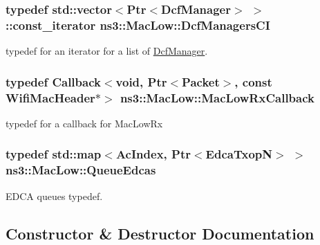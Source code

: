 \subsubsection[{\texorpdfstring{Dcf\+Managers\+CI}{DcfManagersCI}}]{\setlength{\rightskip}{0pt plus 5cm}typedef std\+::vector$<${\bf Ptr}$<${\bf Dcf\+Manager}$>$ $>$\+::const\+\_\+iterator {\bf ns3\+::\+Mac\+Low\+::\+Dcf\+Managers\+CI}\hspace{0.3cm}{\ttfamily [private]}}\hypertarget{classns3_1_1MacLow_abf949b68f435e702d6d30c9a1515b35d}{}\label{classns3_1_1MacLow_abf949b68f435e702d6d30c9a1515b35d}
typedef for an iterator for a list of \hyperlink{classns3_1_1DcfManager}{Dcf\+Manager}. 
\subsubsection[{\texorpdfstring{Mac\+Low\+Rx\+Callback}{MacLowRxCallback}}]{\setlength{\rightskip}{0pt plus 5cm}typedef {\bf Callback}$<$void, {\bf Ptr}$<${\bf Packet}$>$, const {\bf Wifi\+Mac\+Header}$\ast$$>$ {\bf ns3\+::\+Mac\+Low\+::\+Mac\+Low\+Rx\+Callback}}\hypertarget{classns3_1_1MacLow_a1b2eb70255904d5aad88c6a6adbf6224}{}\label{classns3_1_1MacLow_a1b2eb70255904d5aad88c6a6adbf6224}
typedef for a callback for Mac\+Low\+Rx 
\subsubsection[{\texorpdfstring{Queue\+Edcas}{QueueEdcas}}]{\setlength{\rightskip}{0pt plus 5cm}typedef std\+::map$<${\bf Ac\+Index}, {\bf Ptr}$<${\bf Edca\+TxopN}$>$ $>$ {\bf ns3\+::\+Mac\+Low\+::\+Queue\+Edcas}\hspace{0.3cm}{\ttfamily [private]}}\hypertarget{classns3_1_1MacLow_aa79c94ba0439ea9fc9d91dc65f48fd8a}{}\label{classns3_1_1MacLow_aa79c94ba0439ea9fc9d91dc65f48fd8a}


E\+D\+CA queues typedef. 



\subsection{Constructor \& Destructor Documentation}
